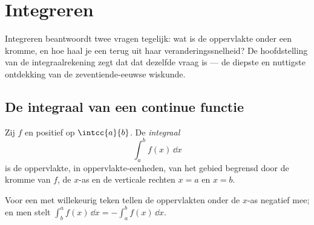 \chapter{Integreren}\label{ch:g12:integ}

Integreren beantwoordt twee vragen tegelijk: wat is de oppervlakte onder een
kromme, en hoe haal je een  terug uit haar veranderingssnelheid? De
hoofdstelling van de integraalrekening zegt dat dat dezelfde vraag is --- de
diepste en nuttigste ontdekking van de zeventiende-eeuwse wiskunde.

\section{De integraal van een continue functie}

\begin{definition}\label{def:g12:integ:area}
Zij $f$  en positief op $\intcc{a}{b}$. De
\emph{integraal}
\[
\int_a^b f(x)\,\dd x
\]
is de oppervlakte, in oppervlakte-eenheden, van het gebied begrensd door de
kromme van $f$, de $x$-as en de verticale rechten $x = a$ en $x = b$.
\end{definition}

\begin{omfigure}
\end{omfigure}

Voor een  met willekeurig teken tellen de oppervlakten onder de
$x$-as negatief mee; en men stelt
$\int_b^a f(x)\,\dd x = -\int_a^b f(x)\,\dd x$.

